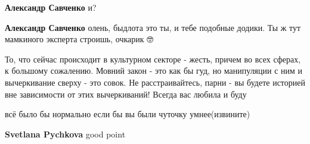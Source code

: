 \begin{itemize}
\begin{itemize}
 
\textbf{Александр Савченко} и?

 
\textbf{Александр Савченко} олень, быдлота это ты, и тебе подобные додики. Ты ж тут мамкиного эксперта строишь, очкарик 🤓

\end{itemize}

 

То, что сейчас происходит в культурном секторе - жесть, причем во всех сферах,
к большому сожалению. Мовний закон - это как бы гуд, но манипуляции с ним и
вычеркивание сверху - это совок. Не расстраивайтесь, парни - вы будете историей
вне зависимости от этих вычеркиваний! Всегда вас любила и буду 💛💙


 
всё было бы нормально если бы вы были чуточку умнее(извините)

\begin{itemize}
 
\textbf{Svetlana Pychkova} good point \Smiley[1.0][yellow]

 

\end{itemize}
\end{itemize}
